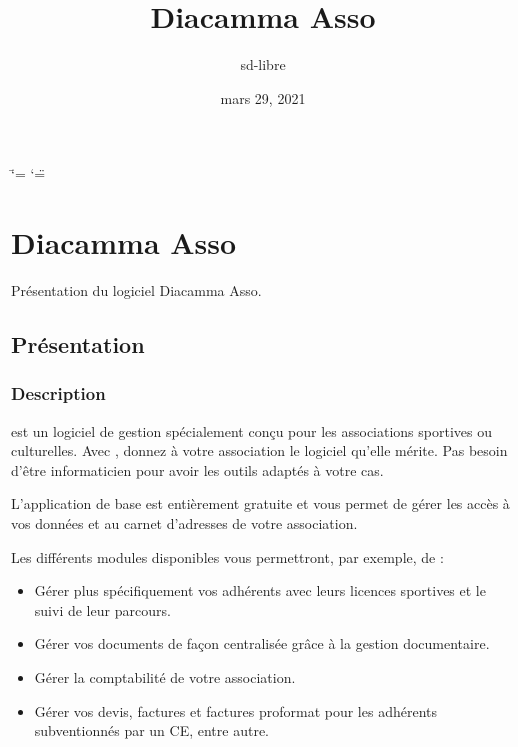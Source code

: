 \documentclass[a4paper,10pt,oneside,french]{sphinxmanual}
\title{Diacamma Asso}
\date{mars 29, 2021}
\author{sd-libre}
\begin{document}
\ifdefined\shorthandoff
  \ifnum\catcode`\=\string=\active\shorthandoff{=}\fi
  \ifnum\catcode`\"=\active{}\fi
\fi

\pagestyle{empty}
\sphinxmaketitle
\pagestyle{plain}
\sphinxtableofcontents
\pagestyle{normal}
\label{\detokenize{index::doc}}



\chapter{Diacamma Asso}
\label{\detokenize{asso/index:diacamma-asso}}\label{\detokenize{asso/index::doc}}
\sphinxAtStartPar
Présentation du logiciel Diacamma Asso.


\section{Présentation}
\label{\detokenize{asso/presentation:presentation}}\label{\detokenize{asso/presentation::doc}}

\subsection{Description}
\label{\detokenize{asso/presentation:description}}
\sphinxAtStartPar
{} est un logiciel de gestion spécialement conçu pour les associations sportives ou culturelles.
Avec , donnez à votre association le logiciel qu’elle mérite. Pas besoin d’être informaticien pour avoir les outils adaptés à votre cas.

\sphinxAtStartPar
L’application de base est entièrement gratuite et vous permet de gérer les accès à vos données et au carnet d’adresses de votre association.

\sphinxAtStartPar
Les différents modules disponibles vous permettront, par exemple, de :
\begin{itemize}
\item {} 
\sphinxAtStartPar
Gérer plus spécifiquement vos adhérents avec leurs licences sportives et le suivi de leur parcours.

\item {} 
\sphinxAtStartPar
Gérer vos documents de façon centralisée grâce à la gestion documentaire.

\item {} 
\sphinxAtStartPar
Gérer la comptabilité de votre association.

\item {} 
\sphinxAtStartPar
Gérer vos devis, factures et factures proformat pour les adhérents subventionnés par un CE, entre autre.

\end{itemize}
\end{document}
